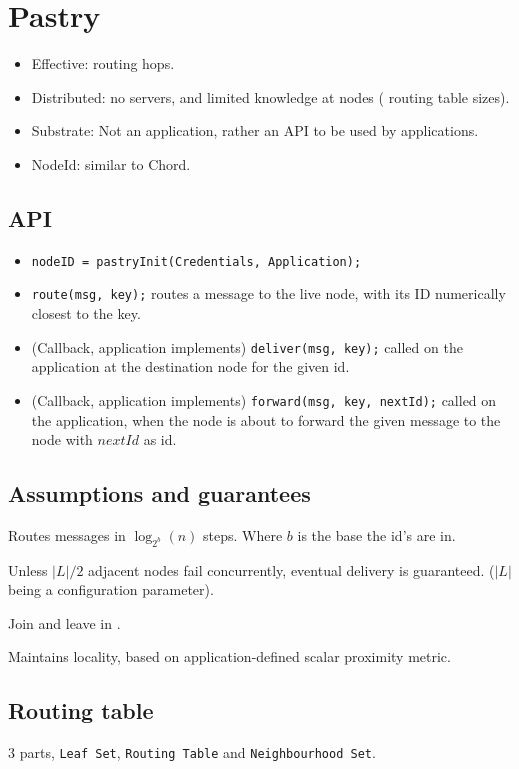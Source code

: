 	\section{Pastry}
	\begin{itemize}
		\item Effective:  routing hops.
		\item Distributed: no servers, and limited knowledge at nodes ( routing table sizes).
		\item Substrate: Not an application, rather an \gls{API} to be used by applications.
		\item NodeId: similar to Chord.
	\end{itemize}
	
	\subsection{API}
	\begin{itemize}
		\item \texttt{nodeID = pastryInit(Credentials, Application);}
		\item \texttt{route(msg, key);} routes a message to the live node, with its ID numerically closest to the key.
		\item (Callback, application implements) \texttt{deliver(msg, key);} called on the application at the destination node for the given id.
		\item (Callback, application implements) \texttt{forward(msg, key, nextId);} called on the application, when the node is about to forward the given message to the node with $nextId$ as id.
	\end{itemize}
	
	\subsection{Assumptions and guarantees}
	Routes messages in $\log_{2^b}(n)$ steps. Where $b$ is the base the id's are in.

	Unless $\lvert L \rvert / 2$ adjacent nodes fail concurrently, eventual delivery is guaranteed. ($\lvert L \rvert$ being a configuration parameter).
	
	Join and leave in .
	
	Maintains locality, based on application-defined scalar proximity metric.
	
	\subsection{Routing table}
	3 parts, \texttt{Leaf Set}, \texttt{Routing Table} and \texttt{Neighbourhood Set}.
	
